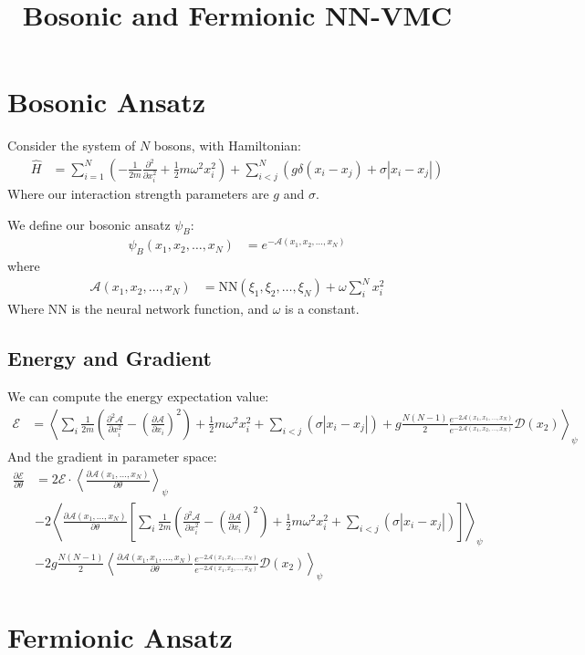 \documentclass{notes}
\title{Bosonic and Fermionic NN-VMC}
\date{}
\begin{document}
\maketitle
\tableofcontents
\newpage
\section{Bosonic Ansatz}
Consider the system of $N$ bosons, with Hamiltonian:
 \begin{align*}
	 \hat{H} &= \sum_{i=1}^N \left(-\frac{1}{2m}\frac{\partial ^2}{\partial x_i^2} + \frac{1}{2}m\omega^2 x_i^2\right) + \sum_{i<j}^N
	 \left(g\delta\left(x_i-x_j\right) + \sigma  |x_i - x_j|\right)
\end{align*}
Where our interaction strength parameters are $g$ and  $\sigma$.


We define our bosonic ansatz $\psi_B$:
 \begin{align*}
	 \psi_B \left(x_1,x_2,\dots,x_N\right) &= e^{-\mathcal{A}\left(x_1,x_2,\dots,x_N\right)}
\end{align*}
where 
 \begin{align*}
	 \mathcal{A}\left(x_1,x_2,\dots, x_N\right) &= \text{NN}\left(\xi_1,\xi_2,\dots,\xi_N\right) + \omega \sum_{i}^N x_i^2 
\end{align*}
Where $\text{NN}$ is the neural network function, and  $\omega$ is a constant.

\subsection{Energy and Gradient}
We can compute the energy expectation value:
 \begin{align*}
	 \mathcal{E} &= \left\langle \sum_i \frac{1}{2m}\left(\frac{\partial ^2 \mathcal{A}}{\partial x_i^2} - \left(\frac{\partial \mathcal{A}}{\partial x_i}\right)^2\right)
		 + \frac{1}{2}m\omega^2x_i^2 + \sum_{i<j} \left(\sigma |x_i-x_j|\right) + g \frac{N \left(N-1\right)}{2} \frac{e^{-2
		 \mathcal{A}\left(x_1,x_1,\dots,x_N\right)}}{e^{-2 \mathcal{A}\left(x_1,x_2,\dots,x_N\right)}}\mathcal{D}\left(x_2\right)
	 \right\rangle_{\psi}
\end{align*}
And the gradient in parameter space:
\begin{align*}
	\frac{\partial \mathcal{E}}{\partial \theta} &= 2 \mathcal{E}\cdot \left\langle \frac{\partial \mathcal{A}\left(x_1,\dots,x_N\right)}{\partial \theta}
		\right\rangle_{\psi} \\ &- 2 \left\langle \frac{\partial \mathcal{A}\left(x_1,\dots,x_N\right)}{\partial \theta} \left[\sum_i
	\frac{1}{2m}\left(\frac{\partial ^2 \mathcal{A}}{\partial x_i^2 } - \left(\frac{\partial \mathcal{A}}{\partial x_i}\right)^2\right) +
\frac{1}{2}m\omega^2 x_i^2 + \sum_{i<j}\left(\sigma | x_i - x_j|\right)\right]\right\rangle_{\psi} \\ 
								&- 2g \frac{N\left(N - 1\right)}{2} \left\langle \frac{\partial \mathcal{A}\left(x_1,x_1,\dots,x_N\right)}{\partial \theta}\frac{e^{-2
								\mathcal{A}\left(x_1,x_1,\dots,x_N\right)}}{e^{-2 \mathcal{A}\left(x_1,x_2,\dots,x_N\right)}}
							\mathcal{D}\left(x_2\right)\right\rangle_{\psi}
\end{align*}

\section{Fermionic Ansatz}
\end{document}
